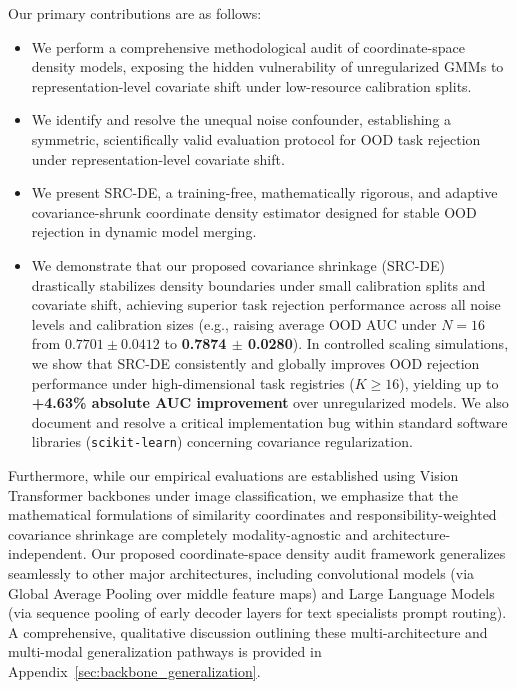 Our primary contributions are as follows:
\begin{itemize}
    \item We perform a comprehensive methodological audit of coordinate-space density models, exposing the hidden vulnerability of unregularized GMMs to representation-level covariate shift under low-resource calibration splits.
    \item We identify and resolve the unequal noise confounder, establishing a symmetric, scientifically valid evaluation protocol for OOD task rejection under representation-level covariate shift.
    \item We present SRC-DE, a training-free, mathematically rigorous, and adaptive covariance-shrunk coordinate density estimator designed for stable OOD rejection in dynamic model merging.
    \item We demonstrate that our proposed covariance shrinkage (SRC-DE) drastically stabilizes density boundaries under small calibration splits and covariate shift, achieving superior task rejection performance across all noise levels and calibration sizes (e.g., raising average OOD AUC under $N=16$ from $0.7701 \pm 0.0412$ to {\bf 0.7874 $\pm$ 0.0280}). In controlled scaling simulations, we show that SRC-DE consistently and globally improves OOD rejection performance under high-dimensional task registries ($K \ge 16$), yielding up to {\bf +4.63\% absolute AUC improvement} over unregularized models. We also document and resolve a critical implementation bug within standard software libraries (\texttt{scikit-learn}) concerning covariance regularization.
\end{itemize}

Furthermore, while our empirical evaluations are established using Vision Transformer backbones under image classification, we emphasize that the mathematical formulations of similarity coordinates and responsibility-weighted covariance shrinkage are completely modality-agnostic and architecture-independent. Our proposed coordinate-space density audit framework generalizes seamlessly to other major architectures, including convolutional models (via Global Average Pooling over middle feature maps) and Large Language Models (via sequence pooling of early decoder layers for text specialists prompt routing). A comprehensive, qualitative discussion outlining these multi-architecture and multi-modal generalization pathways is provided in Appendix~\ref{sec:backbone_generalization}.
